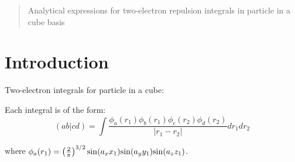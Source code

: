 \documentclass[11pt]{article}
\begin{document}
\maketitle

\begin{abstract}
Analytical expressions for two-electron repulsion integrals in particle
in a cube basis
\end{abstract}

\section{Introduction}
Two-electron integrals for particle in a cube:

Each integral is of the form:
\begin{equation}
(ab|cd) = \int \frac{ \phi_a(r_1) \phi_b(r_1) \phi_c(r_2) \phi_d(r_2)}{|r_1 - r_2|} dr_1 dr_2
\end{equation}

where $\phi_a(r_1) =\left(\frac{2}{\pi}\right)^{3/2} {\rm sin}(a_x x_1) {\rm sin}(a_y y_1) {\rm sin}(a_z z_1)$.
\end{document}
